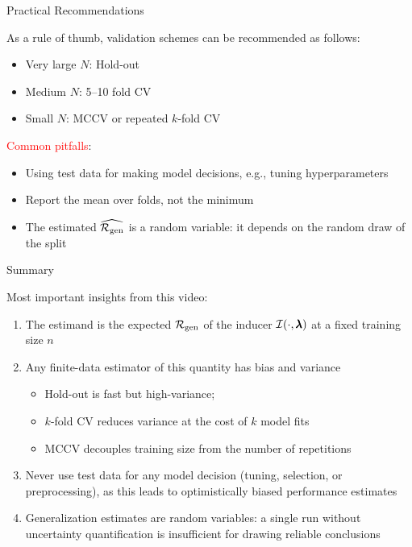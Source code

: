 \documentclass[main]{subfiles}
\begin{document}
\begin{frame}{Practical Recommendations} 

As a \alert{rule of thumb}, validation schemes can be recommended as follows:

\begin{itemize}
    \item Very large $N$: Hold-out
    \item Medium $N$: 5--10 fold CV
    \item Small $N$: MCCV or repeated $k$-fold CV
\end{itemize}
\vspace{.4cm}
\textcolor{red}{Common pitfalls}:
\begin{itemize}
    \item Using test data for making model decisions, e.g., tuning hyperparameters
    \item Report the mean over folds, not the minimum
    \item The estimated $\widehat{\mathcal{R}_{\text{gen}}}$ is a random variable: it depends on the random draw of the split
\end{itemize}

\end{frame}
\begin{frame}{Summary} 

Most important insights from this video:

\begin{enumerate}
    \item The estimand is the expected $\mathcal{R}_{\text{gen}}$ of the inducer $\mathcal{I}(\cdot, \pmb{\lambda})$ at a fixed training size $n$
    \item Any finite-data estimator of this quantity has bias and variance
    \begin{itemize}
        \item Hold-out is fast but high-variance; 
        \item $k$-fold CV reduces variance at the cost of $k$ model fits
        \item MCCV decouples training size from the number of repetitions
    \end{itemize}
    \item Never use test data for any model decision (tuning, selection, or preprocessing), as this leads to optimistically biased performance estimates
    \item Generalization estimates are random variables: a single run without uncertainty quantification is insufficient for drawing reliable conclusions
\end{enumerate}

\end{frame}
\end{document}
